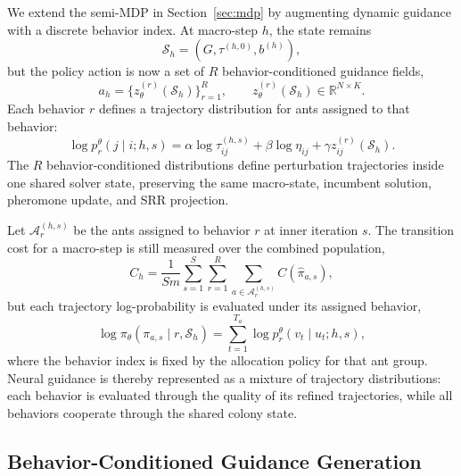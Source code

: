 We extend the semi-MDP in Section~\ref{sec:mdp} by augmenting dynamic guidance with a discrete behavior index. At macro-step $h$, the state remains
\begin{equation}
\mathcal{S}_h=(G,\tau^{(h,0)},b^{(h)}),
\end{equation}
but the policy action is now a set of $R$ behavior-conditioned guidance fields,
\begin{equation}
a_h = \{z_\theta^{(r)}(\mathcal{S}_h)\}_{r=1}^{R},
\qquad
z_\theta^{(r)}(\mathcal{S}_h)\in\mathbb{R}^{N\times K}.
\end{equation}
Each behavior $r$ defines a trajectory distribution for ants assigned to that behavior:
\begin{equation}
\log p_r^\theta(j \mid i; h, s)
= \alpha \log \tau^{(h,s)}_{ij}
+ \beta \log \eta_{ij}
+ \gamma z_{ij}^{(r)}(\mathcal{S}_h).
\label{eq:multi-trajectory-kernel}
\end{equation}
The $R$ behavior-conditioned distributions define perturbation trajectories inside one shared solver state, preserving the same macro-state, incumbent solution, pheromone update, and SRR projection.

Let $\mathcal{A}_r^{(h,s)}$ be the ants assigned to behavior $r$ at inner iteration $s$. The transition cost for a macro-step is still measured over the combined population,
\begin{equation}
C_h =
\frac{1}{S m}\sum_{s=1}^{S}\sum_{r=1}^{R}
\sum_{a\in\mathcal{A}_r^{(h,s)}} C(\hat{\pi}_{a,s}),
\end{equation}
but each trajectory log-probability is evaluated under its assigned behavior,
\begin{equation}
\log \pi_\theta(\pi_{a,s}\mid r,\mathcal{S}_h)
= \sum_{t=1}^{T_a}\log p_r^\theta(v_t\mid u_t;h,s),
\end{equation}
where the behavior index is fixed by the allocation policy for that ant group. Neural guidance is thereby represented as a mixture of trajectory distributions: each behavior is evaluated through the quality of its refined trajectories, while all behaviors cooperate through the shared colony state.

\subsection{Behavior-Conditioned Guidance Generation}
\label{sec:tdg-policy}


